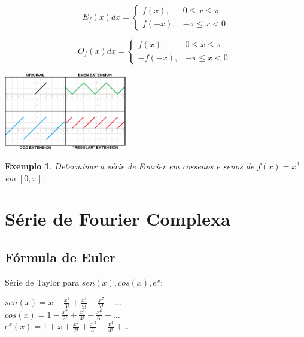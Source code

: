 \documentclass[a4paper,portuguese,9pt,final]{extarticle}
\newtheorem{example}{Exemplo}[section]
\begin{document}
\begin{multicols*}{2}
        $$ E_{f}(x)dx = \begin{cases}

        f(x), & 0 \leq x \leq \pi \\ 

        f(-x), & -\pi \leq x <0

        \end{cases}$$

        $$ O_{f}(x)dx = \begin{cases}

        f(x), & 0 \leq x \leq \pi \\

        -f(-x), & -\pi \leq x <0.

        \end{cases}$$

        \includegraphics[width=0.4\textwidth]{even_odd}


        \begin{example}	
            Determinar a série de Fourier em cossenos e senos de $f(x) = x^2$ em $[0, \pi]$.
        \end{example}

    \section{Série de Fourier Complexa}

        \subsection{Fórmula de Euler}

            
            Série de Taylor para $ sen(x), cos(x), e^{x}: $ \

            $\displaystyle sen(x)=x-\frac{x^{3}}{3!}+\frac{x^{5}}{5!}-\frac{x^{7}}{7!}+... $ \\ 

            $\displaystyle cos(x)=1-\frac{x^{2}}{2!}+\frac{x^{4}}{4!}-\frac{x^{6}}{6!}+... $ \\ 

            $\displaystyle  e^{x}(x) = 1 + x+\frac{x^{2}}{2!}+\frac{x^{3}}{3!}+ \frac{x^{4}}{4!} + ... $ \\ 


\end{multicols*}
\end{document}
